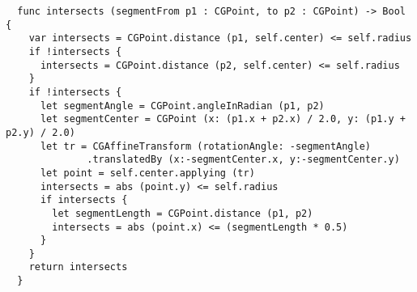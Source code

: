 \begin{center}
\end{center}


\begin{lstlisting}
  func intersects (segmentFrom p1 : CGPoint, to p2 : CGPoint) -> Bool {
    var intersects = CGPoint.distance (p1, self.center) <= self.radius
    if !intersects {
      intersects = CGPoint.distance (p2, self.center) <= self.radius
    }
    if !intersects {
      let segmentAngle = CGPoint.angleInRadian (p1, p2)
      let segmentCenter = CGPoint (x: (p1.x + p2.x) / 2.0, y: (p1.y + p2.y) / 2.0)
      let tr = CGAffineTransform (rotationAngle: -segmentAngle)
              .translatedBy (x:-segmentCenter.x, y:-segmentCenter.y)
      let point = self.center.applying (tr)
      intersects = abs (point.y) <= self.radius
      if intersects {
        let segmentLength = CGPoint.distance (p1, p2)
        intersects = abs (point.x) <= (segmentLength * 0.5)
      }
    }
    return intersects
  }
\end{lstlisting}

